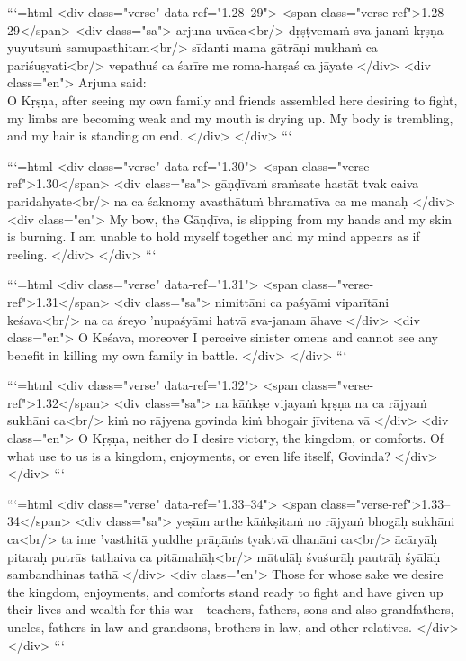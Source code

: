 ```{=html}
<div class="verse" data-ref="1.28–29">
  <span class="verse-ref">1.28–29</span>
  <div class="sa">
    arjuna uvāca<br/>
    dṛṣṭvemaṁ sva-janaṁ kṛṣṇa yuyutsuṁ samupasthitam<br/>
    sīdanti mama gātrāṇi mukhaṁ ca pariśuṣyati<br/>
    vepathuś ca śarīre me roma-harṣaś ca jāyate
  </div>
  <div class="en">
    \hspace*{1em}Arjuna said: \\ O Kṛṣṇa, after seeing my own family and friends assembled here desiring to fight, my limbs are becoming weak and my mouth is drying up. My body is trembling, and my hair is standing on end.
  </div>
</div>
```



```{=html}
<div class="verse" data-ref="1.30">
  <span class="verse-ref">1.30</span>
  <div class="sa">
    gāṇḍīvaṁ sraṁsate hastāt tvak caiva paridahyate<br/>
    na ca śaknomy avasthātuṁ bhramatīva ca me manaḥ
  </div>
  <div class="en">
    My bow, the Gāṇḍīva, is slipping from my hands and my skin is burning. I am unable to hold myself together and my mind appears as if reeling.
  </div>
</div>
```



```{=html}
<div class="verse" data-ref="1.31">
  <span class="verse-ref">1.31</span>
  <div class="sa">
    nimittāni ca paśyāmi viparītāni keśava<br/>
    na ca śreyo ’nupaśyāmi hatvā sva-janam āhave
  </div>
  <div class="en">
    O Keśava, moreover I perceive sinister omens and cannot see any benefit in killing my own family in battle.
  </div>
</div>
```



```{=html}
<div class="verse" data-ref="1.32">
  <span class="verse-ref">1.32</span>
  <div class="sa">
    na kāṅkṣe vijayaṁ kṛṣṇa na ca rājyaṁ sukhāni ca<br/>
    kiṁ no rājyena govinda kiṁ bhogair jīvitena vā
  </div>
  <div class="en">
    O Kṛṣṇa, neither do I desire victory, the kingdom, or comforts. Of what use to us is a kingdom, enjoyments, or even life itself, Govinda?
  </div>
</div>
```



```{=html}
<div class="verse" data-ref="1.33–34">
  <span class="verse-ref">1.33–34</span>
  <div class="sa">
    yeṣām arthe kāṅkṣitaṁ no rājyaṁ bhogāḥ sukhāni ca<br/>
    ta ime ’vasthitā yuddhe prāṇāṁs tyaktvā dhanāni ca<br/>
    ācāryāḥ pitaraḥ putrās tathaiva ca pitāmahāḥ<br/>
    mātulāḥ śvaśurāḥ pautrāḥ śyālāḥ sambandhinas tathā
  </div>
  <div class="en">
    Those for whose sake we desire the kingdom, enjoyments, and comforts stand ready to fight and have given up their lives and wealth for this war---teachers, fathers, sons and also grandfathers, uncles, fathers-in-law and grandsons, brothers-in-law, and other relatives.
  </div>
</div>
```




